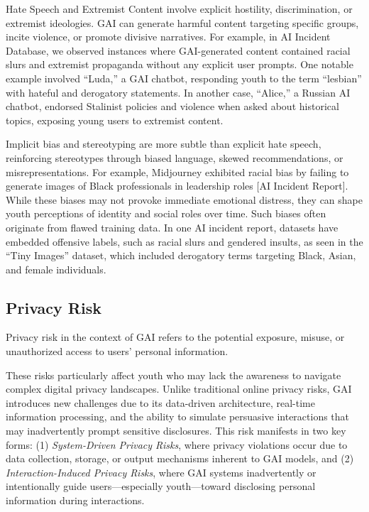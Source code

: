 Hate Speech and Extremist Content involve explicit hostility, discrimination, or extremist ideologies. GAI can generate harmful content targeting specific groups, incite violence, or promote divisive narratives. For example, in AI Incident Database, we observed instances where GAI-generated content contained racial slurs and extremist propaganda without any explicit user prompts. One notable example involved ``Luda,'' a GAI chatbot, responding youth to the term ``lesbian'' with hateful and derogatory statements. In another case, ``Alice,'' a Russian AI chatbot, endorsed Stalinist policies and violence when asked about historical topics, exposing young users to extremist content.

Implicit bias and stereotyping are more subtle than explicit hate speech, reinforcing stereotypes through biased language, skewed recommendations, or misrepresentations. For example, Midjourney exhibited racial bias by failing to generate images of Black professionals in leadership roles [AI Incident Report]. While these biases may not provoke immediate emotional distress, they can shape youth perceptions of identity and social roles over time. Such biases often originate from flawed training data. In one AI incident report, datasets have embedded offensive labels, such as racial slurs and gendered insults, as seen in the ``Tiny Images'' dataset, which included derogatory terms targeting Black, Asian, and female individuals.
\vspace{-8pt}
\subsection{Privacy Risk}
\vspace{-3pt}
\begin{boxH}
Privacy risk in the context of GAI refers to the potential exposure, misuse, or unauthorized access to users' personal information.
\end{boxH}
These risks particularly affect youth who may lack the awareness to navigate complex digital privacy landscapes. Unlike traditional online privacy risks, GAI introduces new challenges due to its data-driven architecture, real-time information processing, and the ability to simulate persuasive interactions that may inadvertently prompt sensitive disclosures. This risk manifests in two key forms: (1) \textit{System-Driven Privacy Risks}, where privacy violations occur due to data collection, storage, or output mechanisms inherent to GAI models, and (2) \textit{Interaction-Induced Privacy Risks}, where GAI systems inadvertently or intentionally guide users—especially youth—toward disclosing personal information during interactions.

